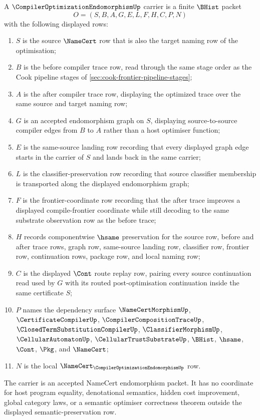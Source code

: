 \begin{definition}
\label{def:compiler-optimization-endomorphism-carrier}
A $\CompilerOptimizationEndomorphismUp$ carrier is a finite $\BHist$ packet
$$
O=(S,B,A,G,E,L,F,H,C,P,N)
$$
with the following displayed rows:
\begin{enumerate}
\item $S$ is the source $\NameCert$ row that is also the target naming row of the optimisation;
\item $B$ is the before compiler trace row, read through the same stage order as the Cook pipeline stages of \autoref{sec:cook-frontier-pipeline-stages};
\item $A$ is the after compiler trace row, displaying the optimized trace over the same source and target naming row;
\item $G$ is an accepted endomorphism graph on $S$, displaying source-to-source compiler edges from $B$ to $A$ rather than a host optimiser function;
\item $E$ is the same-source landing row recording that every displayed graph edge starts in the carrier of $S$ and lands back in the same carrier;
\item $L$ is the classifier-preservation row recording that source classifier membership is transported along the displayed endomorphism graph;
\item $F$ is the frontier-coordinate row recording that the after trace improves a displayed compile-frontier coordinate while still decoding to the same substrate observation row as the before trace;
\item $H$ records componentwise $\hsame$ preservation for the source row, before and after trace rows, graph row, same-source landing row, classifier row, frontier row, continuation rows, package row, and local naming row;
\item $C$ is the displayed $\Cont$ route replay row, pairing every source continuation read used by $G$ with its routed post-optimisation continuation inside the same certificate $S$;
\item $P$ names the dependency surface $\NameCertMorphismUp$, $\CertificateCompilerUp$, $\CompilerCompositionTraceUp$, $\ClosedTermSubstitutionCompilerUp$, $\ClassifierMorphismUp$, $\CellularAutomatonUp$, $\CellularTrustSubstrateUp$, $\BHist$, $\hsame$, $\Cont$, $\Pkg$, and $\NameCert$;
\item $N$ is the local $\NameCert_{\CompilerOptimizationEndomorphismUp}$ row.
\end{enumerate}
The carrier is an accepted NameCert endomorphism packet. It has no coordinate for host program equality, denotational semantics, hidden cost improvement, global category laws, or a semantic optimiser correctness theorem outside the displayed semantic-preservation row.
\end{definition}

